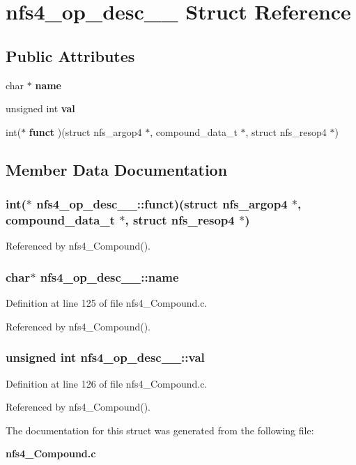 \section{nfs4\_\-op\_\-desc\_\-\_\- Struct Reference}
\label{structnfs4__op__desc____}
\subsection*{Public Attributes}
\begin{CompactItemize}
\item 
char $\ast$ {\bf name}
\item 
unsigned int {\bf val}
\item 
int($\ast$ {\bf funct} )(struct nfs\_\-argop4 $\ast$, compound\_\-data\_\-t $\ast$, struct nfs\_\-resop4 $\ast$)
\end{CompactItemize}


\subsection{Member Data Documentation}
\subsubsection{\setlength{\rightskip}{0pt plus 5cm}int($\ast$ {\bf nfs4\_\-op\_\-desc\_\-\_\-::funct})(struct nfs\_\-argop4 $\ast$, compound\_\-data\_\-t $\ast$, struct nfs\_\-resop4 $\ast$)}\label{structnfs4__op__desc_____o2}




Referenced by nfs4\_\-Compound().
\subsubsection{\setlength{\rightskip}{0pt plus 5cm}char$\ast$ {\bf nfs4\_\-op\_\-desc\_\-\_\-::name}}\label{structnfs4__op__desc_____o0}




Definition at line 125 of file nfs4\_\-Compound.c.

Referenced by nfs4\_\-Compound().
\subsubsection{\setlength{\rightskip}{0pt plus 5cm}unsigned int {\bf nfs4\_\-op\_\-desc\_\-\_\-::val}}\label{structnfs4__op__desc_____o1}




Definition at line 126 of file nfs4\_\-Compound.c.

Referenced by nfs4\_\-Compound().

The documentation for this struct was generated from the following file:\begin{CompactItemize}
\item 
{\bf nfs4\_\-Compound.c}\end{CompactItemize}
